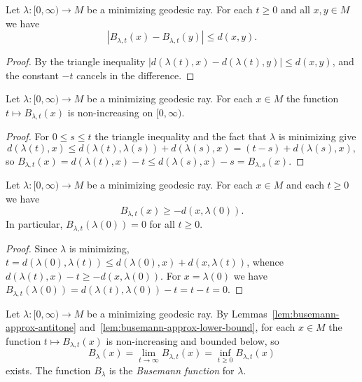 \begin{lemma}
\label{lem:busemann-approx-lipschitz}
\leanok
{}
Let $\lambda\colon [0,\infty)\to M$ be a minimizing geodesic ray.
For each $t\ge 0$ and all $x,y\in M$ we have
$$|B_{\lambda,t}(x)-B_{\lambda,t}(y)|\le d(x,y).$$
\end{lemma}

\begin{proof}
\leanok
By the triangle inequality
$|d(\lambda(t),x)-d(\lambda(t),y)|\le d(x,y)$, and the constant
$-t$ cancels in the difference.
\end{proof}

\begin{lemma}
\label{lem:busemann-approx-antitone}
\leanok
{}
Let $\lambda\colon [0,\infty)\to M$ be a minimizing geodesic ray.
For each $x\in M$ the function $t\mapsto B_{\lambda,t}(x)$ is
non-increasing on $[0,\infty)$.
\end{lemma}

\begin{proof}
\leanok
For $0\le s\le t$ the triangle inequality and the fact that
$\lambda$ is minimizing give
$$d(\lambda(t),x)\le d(\lambda(t),\lambda(s))+d(\lambda(s),x)
=(t-s)+d(\lambda(s),x),$$
so $B_{\lambda,t}(x)=d(\lambda(t),x)-t\le
d(\lambda(s),x)-s=B_{\lambda,s}(x)$.
\end{proof}

\begin{lemma}
\label{lem:busemann-approx-lower-bound}
\leanok
{}
Let $\lambda\colon [0,\infty)\to M$ be a minimizing geodesic ray.
For each $x\in M$ and each $t\ge 0$ we have
$$B_{\lambda,t}(x)\ge -d(x,\lambda(0)).$$
In particular, $B_{\lambda,t}(\lambda(0))=0$ for all $t\ge 0$.
\end{lemma}

\begin{proof}
\leanok
Since $\lambda$ is minimizing,
$t=d(\lambda(0),\lambda(t))\le d(\lambda(0),x)+d(x,\lambda(t))$,
whence $d(\lambda(t),x)-t\ge -d(x,\lambda(0))$. For $x=\lambda(0)$
we have $B_{\lambda,t}(\lambda(0))=d(\lambda(t),\lambda(0))-t=t-t=0$.
\end{proof}

\begin{definition}
\label{def:busemann-function}
\leanok
{}
Let $\lambda\colon [0,\infty)\to M$ be a minimizing geodesic ray. By
Lemmas~\ref{lem:busemann-approx-antitone}
and~\ref{lem:busemann-approx-lower-bound}, for each $x\in M$ the
function $t\mapsto B_{\lambda,t}(x)$ is non-increasing and bounded
below, so
$$B_\lambda(x)=\lim_{t\rightarrow \infty} B_{\lambda,t}(x)
=\inf_{t\ge 0}B_{\lambda,t}(x)$$
exists. The function $B_\lambda$ is the {\sl Busemann function} for
$\lambda$.
\end{definition}

